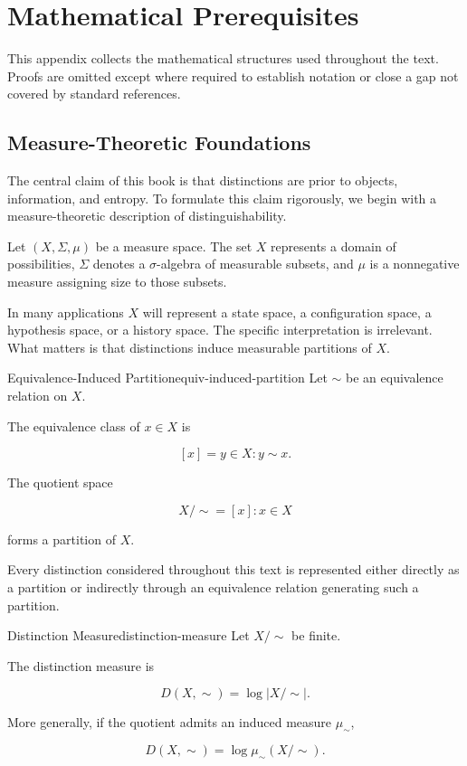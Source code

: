 \documentclass[12pt,twoside,openright]{book}
\begin{document}
\chapter{Mathematical Prerequisites}
\label{app:math}

This appendix collects the mathematical structures used
throughout the text. Proofs are omitted except where
required to establish notation or close a gap not covered
by standard references.

\section{Measure-Theoretic Foundations}

The central claim of this book is that distinctions are prior to objects, information, and entropy. To formulate this claim rigorously, we begin with a measure-theoretic description of distinguishability.

Let $(X,\Sigma,\mu)$ be a measure space. The set $X$ represents a domain of possibilities, $\Sigma$ denotes a $\sigma$-algebra of measurable subsets, and $\mu$ is a nonnegative measure assigning size to those subsets.

In many applications $X$ will represent a state space, a configuration space, a hypothesis space, or a history space. The specific interpretation is irrelevant. What matters is that distinctions induce measurable partitions of $X$.

\begin{definition}{Equivalence-Induced Partition}{equiv-induced-partition}
Let $\sim$ be an equivalence relation on $X$.

The equivalence class of $x\in X$ is

\[
[x]
=

{y\in X : y\sim x}.
\]

The quotient space

\[
X/{\sim}
=

{[x] : x\in X}
\]

forms a partition of $X$.
\end{definition}

Every distinction considered throughout this text is represented either directly as a partition or indirectly through an equivalence relation generating such a partition.

\begin{definition}{Distinction Measure}{distinction-measure}
Let $X/{\sim}$ be finite.

The distinction measure is

\[
D(X,\sim)
=

\log |X/{\sim}|.
\]

More generally, if the quotient admits an induced measure
$\mu_{\sim}$,

\[
D(X,\sim)
=

\log \mu_{\sim}(X/{\sim}).
\]
\end{definition}
\end{document}
